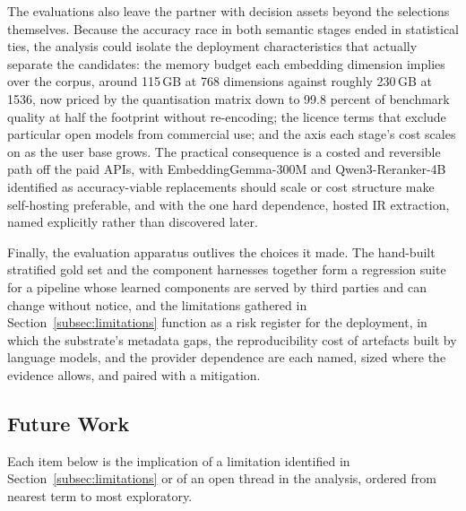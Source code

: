 The evaluations also leave the partner with decision assets beyond the selections themselves. Because the accuracy race in both semantic stages ended in statistical ties, the analysis could isolate the deployment characteristics that actually separate the candidates: the memory budget each embedding dimension implies over the corpus, around 115\,GB at 768 dimensions against roughly 230\,GB at 1536, now priced by the quantisation matrix down to 99.8 percent of benchmark quality at half the footprint without re-encoding; the licence terms that exclude particular open models from commercial use; and the axis each stage's cost scales on as the user base grows. The practical consequence is a costed and reversible path off the paid APIs, with EmbeddingGemma-300M and Qwen3-Reranker-4B identified as accuracy-viable replacements should scale or cost structure make self-hosting preferable, and with the one hard dependence, hosted IR extraction, named explicitly rather than discovered later.

Finally, the evaluation apparatus outlives the choices it made. The hand-built stratified gold set and the component harnesses together form a regression suite for a pipeline whose learned components are served by third parties and can change without notice, and the limitations gathered in Section~\ref{subsec:limitations} function as a risk register for the deployment, in which the substrate's metadata gaps, the reproducibility cost of artefacts built by language models, and the provider dependence are each named, sized where the evidence allows, and paired with a mitigation.

\subsection{Future Work}
\label{sec:conclusion-future}

Each item below is the implication of a limitation identified in Section~\ref{subsec:limitations} or of an open thread in the analysis, ordered from nearest term to most exploratory.

